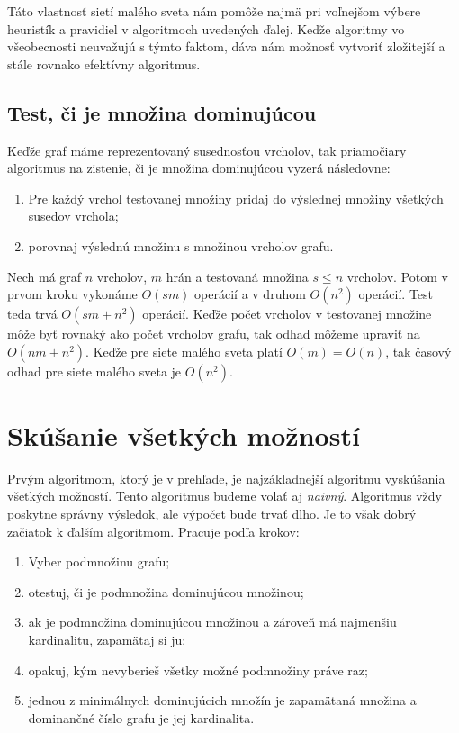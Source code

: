 Táto vlastnosť sietí malého sveta nám pomôže najmä pri voľnejšom výbere 
heuristík a pravidiel v algoritmoch uvedených ďalej. Keďže algoritmy vo 
všeobecnosti neuvažujú s týmto faktom, dáva nám možnosť vytvoriť zložitejší a 
stále rovnako efektívny algoritmus.

\subsection{Test, či je množina dominujúcou}

Keďže graf máme reprezentovaný susednosťou vrcholov, tak priamočiary algoritmus 
na zistenie, či je množina dominujúcou vyzerá následovne:

\begin{enumerate}
	\item Pre každý vrchol testovanej množiny pridaj do výslednej množiny 
všetkých susedov vrchola;
	\item porovnaj výslednú množinu s množinou vrcholov grafu.
\end{enumerate}

Nech má graf $n$ vrcholov, $m$ hrán a testovaná množina $s \leq n$ vrcholov. 
Potom v prvom kroku vykonáme $O(sm)$ operácií a v druhom $O(n^2)$ operácií. 
Test teda trvá $O(sm + n^2)$ operácií. Keďže počet vrcholov v testovanej 
množine môže byť rovnaký ako počet vrcholov grafu, tak odhad môžeme upraviť na 
$O(nm + n^2)$. Keďže pre siete malého sveta platí $O(m) = O(n)$, tak časový 
odhad pre siete malého sveta je $O(n^2)$.

\section{Skúšanie všetkých možností}

Prvým algoritmom, ktorý je v prehľade, je najzákladnejší algoritmu vyskúšania 
všetkých možností. Tento algoritmus budeme volať aj \emph{naivný}. Algoritmus 
vždy poskytne správny výsledok, ale výpočet bude trvať dlho. Je 
to však dobrý začiatok k ďalším algoritmom. Pracuje podľa krokov:

\begin{enumerate}
	\item \label{itm:bf:one} Vyber podmnožinu grafu;
	\item \label{itm:bf:two} otestuj, či je podmnožina dominujúcou množinou;
	\item \label{itm:bf:three} ak je podmnožina dominujúcou množinou a zároveň má najmenšiu 
kardinalitu, zapamätaj si ju;
	\item \label{itm:bf:four} opakuj, kým nevyberieš všetky možné podmnožiny práve raz;
	\item \label{itm:bf:five} jednou z minimálnych dominujúcich množín je zapamätaná množina a 
dominančné číslo grafu je jej kardinalita.
\end{enumerate}

